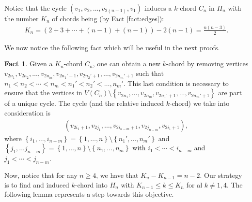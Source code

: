 \documentclass[12pt]{article}
\theoremstyle{definition}
\newtheorem{fact}[thm]{Fact}
\begin{document}
    Notice that the cycle
    $\left(v_1, v_2, \ldots,
    v_{2\left(n-1\right)}, v_1\right)$ 
    induces a $k$-chord
    $C_{n}$ in $H_{n}$
    with the number $K_{n}$ 
    of chords being (by Fact \ref{fact:edges}):
    \begin{gather*}
        K_{n} = \left(
        2 + 3 + \cdots + \left(n-1\right)
        + \left(n-1\right)\right)
        -2\left(n-1\right) =
        \frac{n\left(n-3\right)}{2}.
    \end{gather*}
    
    We now notice the following fact
    which will be useful in the next proofs.

    \begin{fact} \label{fact:new}
        Given a $K_{n}$-chord 
        $C_{n}$, one can obtain
        a new $k$-chord by removing
        vertices $v_{2n_1}, 
        v_{2n_2}, \ldots,
        v_{2n_{m}}, v_{2n_1'+1}, 
        v_{2n_2'+1}, \ldots,
        v_{2n_{m}' + 1}$
        such that
        $n_1 < n_2 < \cdots
        < n_{m} < n_1' < n_2'
        < \ldots, n_{m}'$.
        This last condition is
        necessary to ensure that 
        the vertices in $V\left(C_{n}\right)
        \setminus \left\{
        v_{2n_1}, \ldots, 
        v_{2n_{m}},
        v_{2n_1'+1}, \ldots,
        v_{2n_{m}'+1}\right\}$
        are part of a unique cycle.
        The cycle (and the relative
        induced $k$-chord)
        we take into consideration is
        \begin{gather*}
            \left(v_{2i_1 + 1}, 
            v_{2j_1}, \ldots,
            v_{2i_{n-m}+1},
            v_{2j_{n-m}},
            v_{2i_1 + 1}\right),
        \end{gather*}
        where 
        $\left\{i_1, \ldots, i_{n-m}\right\} =
        \left\{1, \ldots, n\right\} \setminus 
        \left\{n_1', \ldots, n_{m}'\right\}$
        and
        $\left\{j_1, \ldots j_{n-m}\right\}
        = \left\{1, \ldots, n\right\}
        \setminus \left\{n_1, \ldots, n_{m}\right\}$ 
        with $i_1 < \cdots < i_{n-m}$
        and
        $j_1 < \cdots < j_{n-m}$.
    \end{fact}
    
    Now, notice that for any
    $n \geq 4$, we have that
    $K_{n} - K_{n-1} = n-2$.
    Our strategy is to find
    and induced $k$-chord
    into $H_{n}$ with
    $K_{n-1} \leq k \leq K_{n}$ 
    for al $k \neq 1,4$.
    The following lemma
    represents a step towards 
    this objective.
\end{document}
